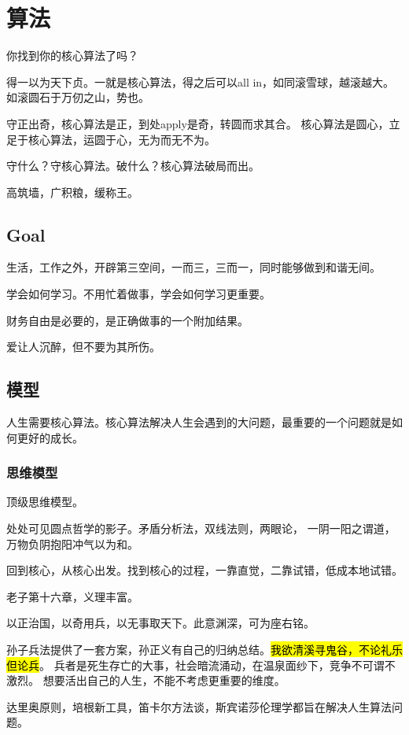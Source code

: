 \chapter{算法}

你找到你的核心算法了吗？

得一以为天下贞。一就是核心算法，得之后可以all in，如同滚雪球，越滚越大。
如滚圆石于万仞之山，势也。

守正出奇，核心算法是正，到处apply是奇，转圆而求其合。
核心算法是圆心，立足于核心算法，运圆于心，无为而无不为。

守什么？守核心算法。破什么？核心算法破局而出。

高筑墙，广积粮，缓称王。

\section{Goal}

生活，工作之外，开辟第三空间，一而三，三而一，同时能够做到和谐无间。

学会如何学习。不用忙着做事，学会如何学习更重要。

财务自由是必要的，是正确做事的一个附加结果。

爱让人沉醉，但不要为其所伤。

\section{模型}

人生需要核心算法。核心算法解决人生会遇到的大问题，最重要的一个问题就是如何更好的成长。

\subsection{思维模型}

顶级思维模型。

处处可见圆点哲学的影子。矛盾分析法，双线法则，两眼论，
一阴一阳之谓道，万物负阴抱阳冲气以为和。

回到核心，从核心出发。找到核心的过程，一靠直觉，二靠试错，低成本地试错。

老子第十六章，义理丰富。

以正治国，以奇用兵，以无事取天下。此意渊深，可为座右铭。

孙子兵法提供了一套方案，孙正义有自己的归纳总结。\hl{我欲清溪寻鬼谷，不论礼乐但论兵}。
兵者是死生存亡的大事，社会暗流涌动，在温泉面纱下，竞争不可谓不激烈。
想要活出自己的人生，不能不考虑更重要的维度。

达里奥原则，培根新工具，笛卡尔方法谈，斯宾诺莎伦理学都旨在解决人生算法问题。

